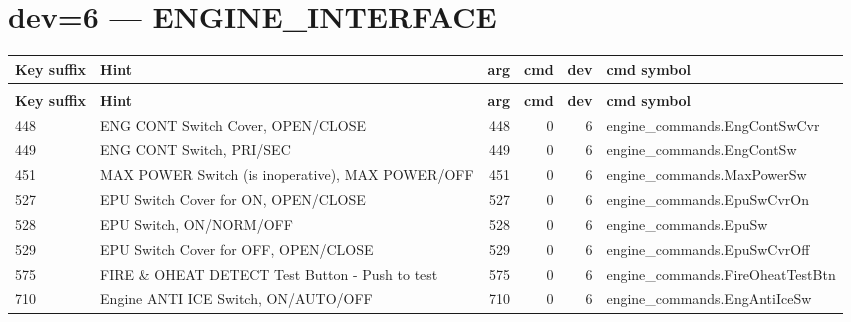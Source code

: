 \documentclass[10pt,a4paper]{article}
\begin{document}
\section{dev=6 — ENGINE\_INTERFACE}
\begin{longtable}{>{\ttfamily\small}p{38mm} >{\small}p{72mm} r r r >{\ttfamily\small}p{48mm}}
\toprule
\textbf{Key suffix} & \textbf{Hint} & \textbf{arg} & \textbf{cmd} & \textbf{dev} & \textbf{cmd symbol} \\
\midrule
\endfirsthead
\multicolumn{6}{l}{\small\itshape continued\ldots}\\
\toprule
\textbf{Key suffix} & \textbf{Hint} & \textbf{arg} & \textbf{cmd} & \textbf{dev} & \textbf{cmd symbol} \\
\midrule
\endhead
\bottomrule
\endfoot
\rowcolor{rowodd}
  448 & ENG CONT Switch Cover, OPEN/CLOSE & 448 & 0 & 6 & engine\_commands.EngContSwCvr \\
  449 & ENG CONT Switch, PRI/SEC & 449 & 0 & 6 & engine\_commands.EngContSw \\
\rowcolor{rowodd}
  451 & MAX POWER Switch (is inoperative), MAX POWER/OFF & 451 & 0 & 6 & engine\_commands.MaxPowerSw \\
  527 & EPU Switch Cover for ON, OPEN/CLOSE & 527 & 0 & 6 & engine\_commands.EpuSwCvrOn \\
\rowcolor{rowodd}
  528 & EPU Switch, ON/NORM/OFF & 528 & 0 & 6 & engine\_commands.EpuSw \\
  529 & EPU Switch Cover for OFF, OPEN/CLOSE & 529 & 0 & 6 & engine\_commands.EpuSwCvrOff \\
\rowcolor{rowodd}
  575 & FIRE \& OHEAT DETECT Test Button - Push to test & 575 & 0 & 6 & engine\_commands.FireOheatTestBtn \\
  710 & Engine ANTI ICE Switch, ON/AUTO/OFF & 710 & 0 & 6 & engine\_commands.EngAntiIceSw \\
\end{longtable}
\end{document}
